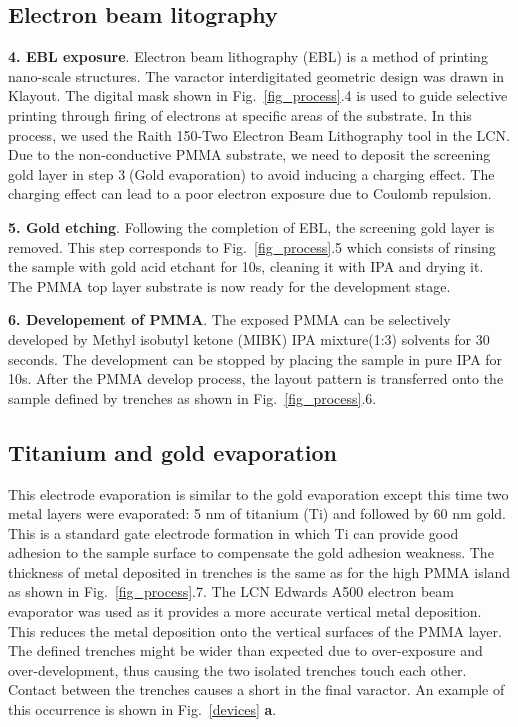 \documentclass[10pt,a4paper,twoside]{article}
\begin{document}
\begin{multicols}{2}
\subsection{Electron beam litography}
\textbf{4. EBL exposure}. Electron beam lithography (EBL) is a method of printing nano-scale structures. The varactor interdigitated geometric design was drawn in Klayout. The digital mask shown in Fig.~\ref{fig_process}.4 is used to guide selective printing through firing of electrons at specific areas of the substrate. In this process, we used the Raith 150-Two Electron Beam Lithography tool in the LCN. Due to the non-conductive PMMA substrate, we need to deposit the screening gold layer in step \textcircled{3}(Gold evaporation) to avoid inducing a charging effect. The charging effect can lead to a poor electron exposure due to Coulomb repulsion.
\par 
\textbf{5. Gold etching}. Following the completion of EBL, the screening gold layer is removed. This step corresponds to Fig.~\ref{fig_process}.5 which consists of rinsing the sample with gold acid etchant for 10s, cleaning it with IPA and drying it. The PMMA top layer substrate is now ready for the development stage. 
\par 
\textbf{6. Developement of PMMA}. The exposed PMMA can be selectively developed by Methyl isobutyl ketone (MIBK) IPA mixture(1:3) solvents for 30 seconds. The development can be stopped by placing the sample in pure IPA for 10s. After the PMMA develop process, the layout pattern is transferred onto the sample defined by trenches as shown in Fig.~\ref{fig_process}.6. 
\par 
\subsection{Titanium and gold evaporation}
This electrode evaporation is similar to the gold evaporation except this time two metal layers were evaporated: 5 nm of titanium (Ti) and followed by 60 nm gold. This is a standard gate electrode formation in which Ti can provide good adhesion to the sample surface to compensate the gold adhesion weakness. The thickness of metal deposited in trenches is the same as for the high PMMA island as shown in Fig.~\ref{fig_process}.7. The LCN Edwards A500 electron beam evaporator was used as it provides a more accurate vertical metal deposition. This reduces the metal deposition onto the vertical surfaces of the PMMA layer. The defined trenches might be wider than expected due to over-exposure and over-development, thus causing the two isolated trenches touch each other. Contact between the trenches causes a short in the final varactor. An example of this occurrence is shown in Fig.~\ref{devices} \textbf{a}.
\par 

\end{multicols}
\end{document}
